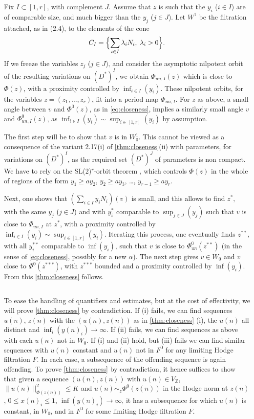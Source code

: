 \documentclass[11pt,a4paper]{article}
\theoremstyle{plain}
\theoremstyle{definition}
\begin{document}
Fix $I\subset[1,r]$, with complement $J$. Assume that $z$ is such that the $y_i$ ($i\in I$) are of comparable size, and much bigger than the $y_j$ ($j\in J$). Let $W^1$ be the filtration attached, as in (2.4), to the elements of the cone
\[
C_I=\Bigl\{\sum_{i\in I}\lambda_i N_i,\; \lambda_i>0\Bigr\}.
\]
If we freeze the variables $z_j$ ($j\in J$), and consider the asymptotic nilpotent orbit of the resulting variations on $(D^*)^I$, we obtain $\Phi_{un,I}(z)$ which is close to $\Phi(z)$, with a proximity controlled by $\inf_{i\in I}(y_i)$. These nilpotent orbits, for the variables $z=(z_1,\dots,z_r)$, fit into a period map $\Phi_{un,I}$. For $z$ as above, a small angle between $v$ and $\Phi^0(z)$, as in \eqref{eq:closeness}, implies a similarly small angle $v$ and $\Phi_{un,I}^0(z)$, as $\inf_{i\in I}(y_i)\sim\sup_{i\in[1,r]}(y_i)$ by assumption.

The first step will be to show that $v$ is in $W^1_0$. This cannot be viewed as a consequence of the variant 2.17(i) of \ref{thm:closeness}(ii) with parameters, for variations on $(D^*)^I$, as the required set $(D^*)^J$ of parameters is non compact. We have to rely on the SL(2)$^r$-orbit theorem \cite{cks}, which controls $\Phi(z)$ in the whole of regions of the form $y_1\geq ay_2$, $y_2\geq ay_3$, \dots, $y_{r-1}\geq ay_r$.

Next, one shows that $(\sum_{i\in I}y_i N_i)(v)$ is small, and this allows to find $z^*$, with the same $y_j$ ($j\in J$) and with $y_i^*$ comparable to $\sup_{j\in J}(y_j)$ such that $v$ is close to $\Phi_{un,I}$ at $z^*$, with a proximity controlled by $\inf_{i\in I}(y_i)\sim\sup_{i\in[1,r]}(y_i)$. Iterating this process, one eventually finds $z^{**}$, with all $y_i^{**}$ comparable to $\inf(y_i)$, such that $v$ is close to $\Phi_{un}^0(z^{**})$ (in the sense of \eqref{eq:closeness}, possibly for a new $\alpha$). The next step gives $v\in W_0$ and $v$ close to $\Phi^0(z^{***})$, with $z^{***}$ bounded and a proximity controlled by $\inf(y_i)$. From this \ref{thm:closeness} follows.

\subsection{}
To ease the handling of quantifiers and estimates, but at the cost of effectivity, we will prove \ref{thm:closeness} by contradiction. If (i) fails, we can find sequences $u(n)$, $z(n)$ with the $(u(n),z(n))$ as in \ref{thm:closeness} (i), the $u(n)$ all distinct and $\inf_i(y(n)_i)\to\infty$. If (ii) fails, we can find sequences as above with each $u(n)$ not in $W_0$. If (i) and (ii) hold, but (iii) fails we can find similar sequences with $u(n)$ constant and $u(n)$ not in $F^0$ for any limiting Hodge filtration $F$. In each case, a subsequence of the offending sequence is again offending. To prove \ref{thm:closeness} by contradiction, it hence suffices to show that given a sequence $(u(n),z(n))$ with $u(n)\in V_{\mathbb{Z}}$, $\|u(n)\|_{\Phi(z(n))}^2\leq K$ and $u(n)\sim_z\Phi^0(z(n))$ in the Hodge norm at $z(n)$, $0\leq x(n)_i\leq 1$, $\inf(y(n)_i)\to\infty$, it has a subsequence for which $u(n)$ is constant, in $W_0$, and in $F^0$ for some limiting Hodge filtration $F$.
\end{document}
